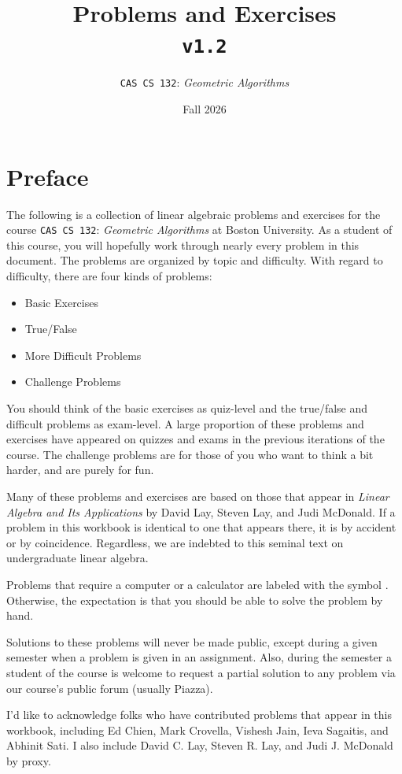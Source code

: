 \documentclass[10pt]{report}
\title{Problems and Exercises \\ \texttt{v1.2}}
\author{\texttt{CAS CS 132}: \textit{Geometric Algorithms}}
\date{Fall 2026}
\begin{document}
\maketitle
\tableofcontents
\thispagestyle{plain}

\chapter*{Preface}

The following is a collection of linear algebraic problems and
exercises for the course \texttt{CAS CS 132}: \textit{Geometric
  Algorithms} at Boston University.  As a student of this course, you
will hopefully work through nearly every problem in this document.
The problems are organized by topic and difficulty.  With regard to
difficulty, there are four kinds of problems:
\begin{itemize}
\item Basic Exercises
\item True/False
\item More Difficult Problems
\item Challenge Problems
\end{itemize}
You should think of the basic exercises as quiz-level and the
true/false and difficult problems as exam-level.  A large proportion
of these problems and exercises have appeared on quizzes and exams in
the previous iterations of the course.  The challenge problems are
for those of you who want to think a bit harder, and are purely for fun.

Many of these problems and exercises are based on those that appear in
\textit{Linear Algebra and Its Applications} by David Lay, Steven Lay,
and Judi McDonald.  If a problem in this workbook is identical to one
that appears there, it is by accident or by coincidence.  Regardless,
we are indebted to this seminal text on undergraduate linear algebra.

Problems that require a computer or a calculator are labeled with the
symbol \faCalculator.  Otherwise, the expectation is that you should
be able to solve the problem by hand.

Solutions to these problems will never be made public, except during a
given semester when a problem is given in an assignment.  Also, during
the semester a student of the course is welcome to request a partial
solution to any problem via our course's public forum (usually Piazza).

I'd like to acknowledge folks who have contributed problems that
appear in this workbook, including Ed Chien, Mark Crovella, Vishesh
Jain, Ieva Sagaitis, and Abhinit Sati.  I also include David C. Lay,
Steven R. Lay, and Judi J. McDonald by proxy.
\end{document}
